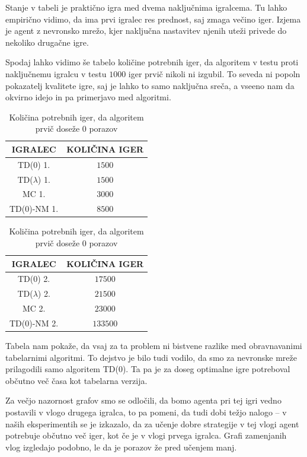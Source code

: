\documentclass[12pt,a4paper]{amsart}
\theoremstyle{definition} %
\theoremstyle{plain} %
\begin{document}
Stanje v tabeli je praktično igra med dvema naključnima igralcema. Tu lahko empirično vidimo, da ima 
prvi igralec res prednost, saj zmaga večino iger. Izjema je agent z nevronsko mrežo, kjer naključna 
nastavitev njenih uteži privede do nekoliko drugačne igre.

Spodaj lahko vidimo še tabelo količine potrebnih iger, da algoritem v testu proti naključnemu igralcu 
v testu $1000$ iger prvič nikoli ni izgubil. To seveda ni popoln pokazatelj kvalitete igre, saj je 
lahko to samo naključna sreča, a vseeno nam da okvirno idejo in pa primerjavo med algoritmi. 

\begin{center}
    \begin{table}[H]
        \begin{tabular}{| c | c |}
            \hline
            IGRALEC & KOLIČINA IGER\\
            \hline
            TD($0$) 1. & $1500$\\
            TD($\lambda$) 1. & $1500$\\
            MC 1. & $3000$\\
            TD($0$)-NM 1. & $8500$\\
            \hline
    \end{tabular}
    \quad
    \begin{tabular}{| c | c |}
        \hline
        IGRALEC & KOLIČINA IGER\\
        \hline
        TD($0$) 2. & $17500$\\
        TD($\lambda$) 2. & $21500$\\
        MC 2. & $23000$\\
        TD($0$)-NM 2. & $133500$\\
        \hline
    \end{tabular}
    \caption{Količina potrebnih iger, da algoritem prvič doseže $0$ porazov}
    \end{table}
\end{center}

Tabela nam pokaže, da vsaj za ta problem ni bistvene razlike med obravnavanimi tabelarnimi algoritmi. 
To dejstvo je bilo tudi vodilo, da smo za nevronske mreže prilagodili samo algoritem TD($0$). Ta pa 
je za doseg optimalne igre potreboval občutno več časa kot tabelarna verzija.

Za večjo nazornost grafov smo se odločili, da bomo agenta pri tej igri vedno postavili v vlogo 
drugega igralca, to pa pomeni, da tudi dobi težjo nalogo -- v naših eksperimentih se je izkazalo, 
da za učenje dobre strategije v tej vlogi agent potrebuje občutno več iger, kot če je v vlogi 
prvega igralca. Grafi zamenjanih vlog izgledajo podobno, le da je porazov že pred učenjem manj.
\end{document}
